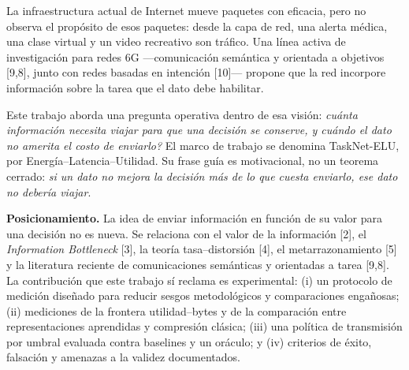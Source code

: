 \documentclass[11pt,letterpaper]{article}
\begin{document}
La infraestructura actual de Internet mueve paquetes con eficacia, pero no observa el prop\'osito de esos paquetes: desde la capa de red, una alerta m\'edica, una clase virtual y un video recreativo son tr\'afico. Una l\'inea activa de investigaci\'on para redes 6G ---comunicaci\'on sem\'antica y orientada a objetivos [9,8], junto con redes basadas en intenci\'on [10]--- propone que la red incorpore informaci\'on sobre la tarea que el dato debe habilitar.

Este trabajo aborda una pregunta operativa dentro de esa visi\'on: \emph{\textquestiondown cu\'anta informaci\'on necesita viajar para que una decisi\'on se conserve, y cu\'ando el dato no amerita el costo de enviarlo?} El marco de trabajo se denomina TaskNet-ELU, por Energ\'ia--Latencia--Utilidad. Su frase gu\'ia es motivacional, no un teorema cerrado: \emph{si un dato no mejora la decisi\'on m\'as de lo que cuesta enviarlo, ese dato no deber\'ia viajar}.

\textbf{Posicionamiento.} La idea de enviar informaci\'on en funci\'on de su valor para una decisi\'on no es nueva. Se relaciona con el valor de la informaci\'on [2], el \emph{Information Bottleneck} [3], la teor\'ia tasa--distorsi\'on [4], el metarrazonamiento [5] y la literatura reciente de comunicaciones sem\'anticas y orientadas a tarea [9,8]. La contribuci\'on que este trabajo s\'i reclama es experimental: (i) un protocolo de medici\'on dise\~nado para reducir sesgos metodol\'ogicos y comparaciones enga\~nosas; (ii) mediciones de la frontera utilidad--bytes y de la comparaci\'on entre representaciones aprendidas y compresi\'on cl\'asica; (iii) una pol\'itica de transmisi\'on por umbral evaluada contra baselines y un or\'aculo; y (iv) criterios de \'exito, falsaci\'on y amenazas a la validez documentados.
\end{document}
